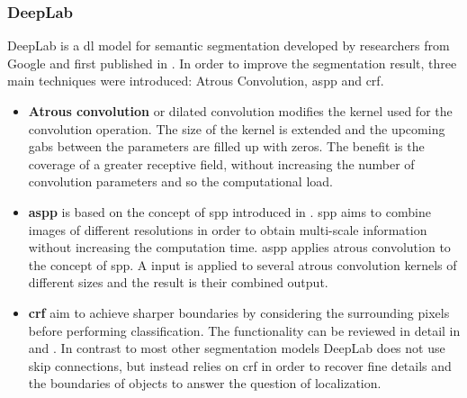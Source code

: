\subsubsection{DeepLab}
DeepLab is a \gls{dl} model for semantic segmentation developed by researchers from Google and first published in \cite{Chen16-DeepLab}.
In order to improve the segmentation result, three main techniques were introduced: Atrous Convolution, \gls{aspp} and \gls{crf}.
\begin{itemize}
	\item \textbf{Atrous convolution} or dilated convolution modifies the kernel used for the convolution operation. 
	The size of the kernel is extended and the upcoming gabs between the parameters are filled up with zeros.
	The benefit is the coverage of a greater receptive field, without increasing the number of convolution parameters and so the computational load.
	\item \textbf{\gls{aspp}} is based on the concept of \gls{spp} introduced in \cite{He15-SPP}.
	\gls{spp} aims to combine images of different resolutions in order to obtain multi-scale information without increasing the computation time.
	\gls{aspp} applies atrous convolution to the concept of \gls{spp}.
	A input is applied to several atrous convolution kernels of different sizes and the result is their combined output. 	
	\item \textbf{\gls{crf}} aim to achieve sharper boundaries by considering the surrounding pixels before performing classification.
	The functionality can be reviewed in detail in \cite{Chen16-DeepLab} and \cite{KK12-CRF}.
	In contrast to most other segmentation models DeepLab does not use skip connections, but instead relies on \gls{crf} in order to recover fine details and the boundaries of objects to answer the question of localization.
\end{itemize}



